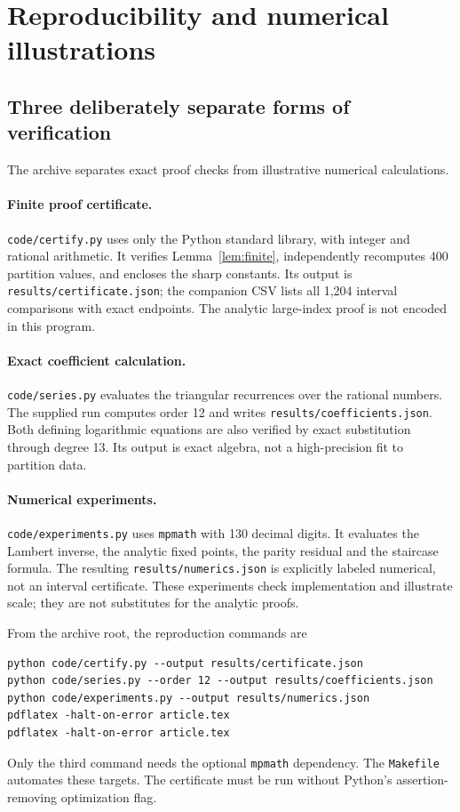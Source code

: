\documentclass[11pt]{article}
\numberwithin{equation}{section}
\theoremstyle{definition}
\theoremstyle{remark}
\begin{document}
\section{Reproducibility and numerical illustrations}\label{sec:computations}
\subsection{Three deliberately separate forms of verification}
The archive separates exact proof checks from illustrative numerical
calculations.

\paragraph{Finite proof certificate.}
\texttt{code/certify.py} uses only the Python standard library, with
integer and rational arithmetic. It verifies
Lemma~\ref{lem:finite}, independently recomputes 400 partition values,
and encloses the sharp constants. Its output is
\texttt{results/certificate.json}; the companion CSV lists all 1,204
interval comparisons with exact endpoints. The analytic large-index proof is
not encoded in this program.

\paragraph{Exact coefficient calculation.}
\texttt{code/series.py} evaluates the triangular recurrences over the
rational numbers. The supplied run computes order 12 and writes
\texttt{results/coefficients.json}. Both defining logarithmic equations are also verified by exact
substitution through degree 13. Its output is exact algebra,
not a high-precision fit to partition data.

\paragraph{Numerical experiments.}
\texttt{code/experiments.py} uses \texttt{mpmath} with 130 decimal
digits. It evaluates the Lambert inverse, the analytic fixed points,
the parity residual and the staircase formula. The resulting
\texttt{results/numerics.json} is explicitly labeled numerical, not
an interval certificate. These experiments check implementation and
illustrate scale; they are not substitutes for the analytic proofs.

From the archive root, the reproduction commands are
\begin{lstlisting}
python code/certify.py --output results/certificate.json
python code/series.py --order 12 --output results/coefficients.json
python code/experiments.py --output results/numerics.json
pdflatex -halt-on-error article.tex
pdflatex -halt-on-error article.tex
\end{lstlisting}
Only the third command needs the optional \texttt{mpmath} dependency.
The \texttt{Makefile} automates these targets. The certificate must be
run without Python's assertion-removing optimization flag.
\end{document}
